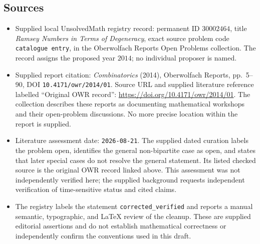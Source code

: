 \documentclass[11pt]{article}
\begin{document}
\subsection{Sources}
\begin{itemize}
\item Supplied local UnsolvedMath registry record: permanent ID \(30002464\), title \emph{Ramsey Numbers in Terms of Degeneracy}, exact source problem code \texttt{catalogue entry}, in the Oberwolfach Reports Open Problems collection. The record assigns the proposed year \(2014\); no individual proposer is named.
\item Supplied report citation: \emph{Combinatorics} (2014), Oberwolfach Reports, pp.~5--90, DOI \texttt{10.4171/owr/2014/01}. Source URL and supplied literature reference labelled ``Original OWR record'': \url{https://doi.org/10.4171/owr/2014/01}. The collection describes these reports as documenting mathematical workshops and their open-problem discussions. No more precise location within the report is supplied.
\item Literature assessment date: \texttt{2026-08-21}. The supplied dated curation labels the problem open, identifies the general non-bipartite case as open, and states that later special cases do not resolve the general statement. Its listed checked source is the original OWR record linked above. This assessment was not independently verified here; the supplied background requests independent verification of time-sensitive status and cited claims.
\item The registry labels the statement \texttt{corrected\_verified} and reports a manual semantic, typographic, and LaTeX review of the cleanup. These are supplied editorial assertions and do not establish mathematical correctness or independently confirm the conventions used in this draft.
\end{itemize}
\end{document}
